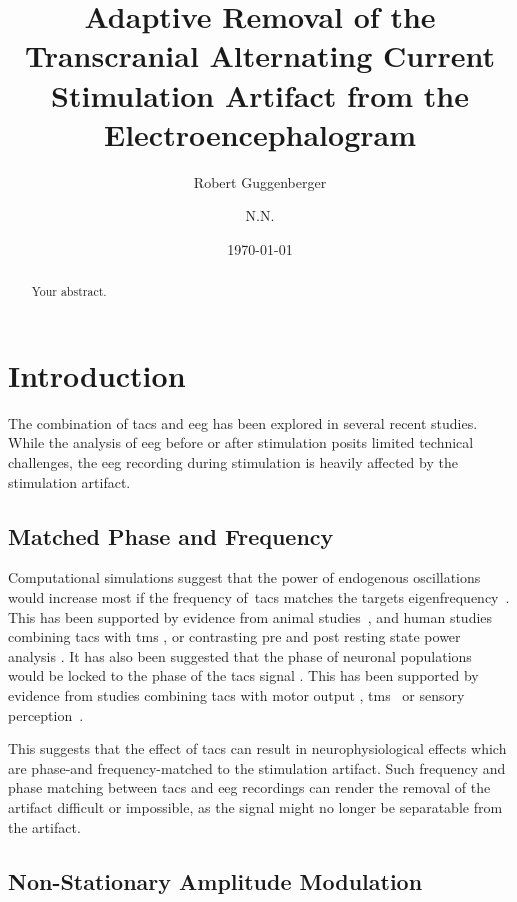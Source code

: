 \documentclass[a4paper]{article}
\title{Adaptive Removal of the Transcranial Alternating Current Stimulation Artifact from the Electroencephalogram}
\author[1,*]{Robert Guggenberger}
\author[1]{N.N.}
\affil[1]{Department for Translational Neurosurgery, University Hospital Tübingen}
\affil[*]{Corresponding author: \email{robert.guggenberger@posteo.eu}}
\date{\today}
\begin{document}
\maketitle
\thispagestyle{fancy}

\begin{abstract}
Your abstract.
\end{abstract}

\section{Introduction}

The combination of \gls{tacs} and \gls{eeg} has been explored in several recent studies. While the analysis of \gls{eeg} before or after stimulation posits limited technical challenges, the \gls{eeg} recording during stimulation is heavily affected by the stimulation artifact.

\subsection{Matched Phase and Frequency}
Computational simulations suggest that the power of endogenous oscillations would increase most if the frequency of~\gls{tacs} matches the targets eigenfrequency~\citep{Kutchko_2013,Zaehle_2010}.
This has been supported by evidence from animal studies~\citep{Schmidt_2014}, and human studies combining \gls{tacs} with \gls{tms} \citep{Guerra_2016}, or contrasting pre and post resting state power analysis \citep{Zaehle_2010}.
It has also been suggested that the phase of neuronal populations would be locked to the phase of the \gls{tacs} signal \citep{Reato_2013}. This has been supported by evidence from studies combining \gls{tacs} with motor output \citep{Brittain_2013}, \gls{tms}~\citep{Raco_2016,Nakazono_2016} or sensory perception~\citep{Gundlach_2016}.

This suggests that the effect of \gls{tacs} can result in neurophysiological effects which are phase-and frequency-matched to the stimulation artifact. Such frequency and phase matching between \gls{tacs} and \gls{eeg} recordings can render the removal of the artifact difficult or impossible, as the signal might no longer be separatable from the artifact.

\subsection{Non-Stationary Amplitude Modulation}
\end{document}
